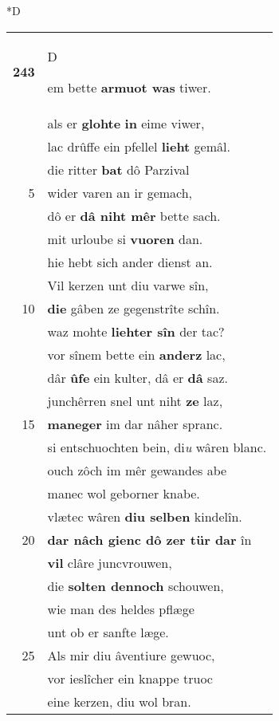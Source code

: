 \documentclass[8pt,a4paper,notitlepage]{article}
\begin{document}
\begin{table}[ht]
\begin{minipage}[t]{0.5\linewidth}
\small
\begin{center}*D
\end{center}
\begin{tabular}{rl}
\textbf{243} & \begin{large}D\end{large}em bette \textbf{armuot was} tiwer.\\ 
 & als er \textbf{glohte} \textbf{in} eime viwer,\\ 
 & lac drûffe ein pfellel \textbf{lieht} gemâl.\\ 
 & die ritter \textbf{bat} dô Parzival\\ 
5 & wider varen an ir gemach,\\ 
 & dô er \textbf{dâ niht mêr} bette sach.\\ 
 & mit urloube si \textbf{vuoren} dan.\\ 
 & hie hebt sich ander dienst an.\\ 
 & Vil kerzen unt diu varwe sîn,\\ 
10 & \textbf{die} gâben ze gegenstrîte schîn.\\ 
 & waz mohte \textbf{liehter sîn} der tac?\\ 
 & vor sînem bette ein \textbf{anderz} lac,\\ 
 & dâr \textbf{ûfe} ein kulter, dâ er \textbf{dâ} saz.\\ 
 & junchêrren snel unt niht \textbf{ze} laz,\\ 
15 & \textbf{maneger} im dar nâher spranc.\\ 
 & si entschuochten bein, di\textit{u} wâren blanc.\\ 
 & ouch zôch im mêr gewandes abe\\ 
 & manec wol geborner knabe.\\ 
 & vlætec wâren \textbf{diu selben} kindelîn.\\ 
20 & \textbf{dar nâch gienc dô zer tür dar} în\\ 
 & \textbf{vil} clâre juncvrouwen,\\ 
 & die \textbf{solten dennoch} schouwen,\\ 
 & wie man des heldes pflæge\\ 
 & unt ob er sanfte læge.\\ 
25 & Als mir diu âventiure gewuoc,\\ 
 & vor ieslîcher ein knappe truoc\\ 
 & eine kerzen, diu wol bran.\\ 

\end{tabular}
\end{minipage}
\end{table}
\end{document}
